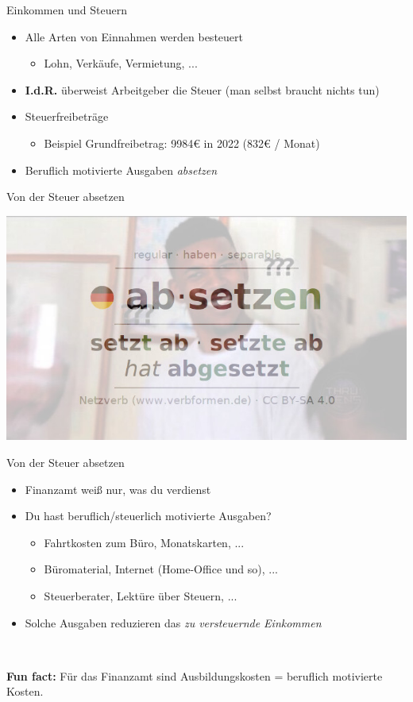 \documentclass{beamer}
\newcommand{\n}{\hfill\\\vspace{0.25cm}}
\begin{document}
			\begin{frame}{Einkommen und Steuern}
				\begin{itemize}
					\item Alle Arten von Einnahmen werden besteuert
					\begin{itemize}
						\item Lohn, Verkäufe, Vermietung, ...
					\end{itemize}
					\item \textbf{I.d.R.} überweist Arbeitgeber die Steuer (man selbst braucht nichts tun)
					\item Steuerfreibeträge
					\begin{itemize}
						\item Beispiel Grundfreibetrag: 9984€ in 2022 (832€ / Monat)
					\end{itemize}
					\item Beruflich motivierte Ausgaben \textit{absetzen}
				\end{itemize}
			\end{frame}
		
			\begin{frame}{Von der Steuer absetzen}
				\begin{center}
					\includegraphics[width=0.75\linewidth]{images/absetzen}
				\end{center}
			\end{frame}
		
			\begin{frame}{Von der Steuer absetzen}
				\begin{itemize}
					\item Finanzamt weiß nur, was du verdienst
					\item Du hast beruflich/steuerlich motivierte Ausgaben?
					\begin{itemize}
						\item Fahrtkosten zum Büro, Monatskarten, ...
						\item Büromaterial, Internet (Home-Office und so), ...
						\item Steuerberater, Lektüre über Steuern, ...
					\end{itemize}
					\item Solche Ausgaben reduzieren das \textit{zu versteuernde Einkommen}
				\end{itemize}\n
				
				\textbf{Fun fact:} Für das Finanzamt sind Ausbildungskosten = beruflich motivierte Kosten.
			\end{frame}
				
\end{document}
